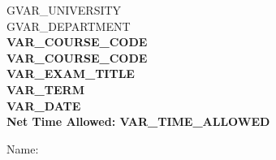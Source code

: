 \thispagestyle{empty}

\begin{center}
    \begin{large}
        GVAR_UNIVERSITY\\ %
        GVAR_DEPARTMENT\\ %
        \vspace*{0.5cm}
        {\bf {}} \hfill {\bf VAR_COURSE_CODE} \hfill {\bf {}} \\
        {\bf VAR_COURSE_CODE}  \\
        {\bf VAR_EXAM_TITLE}  \\
        {\bf VAR_TERM}  \\
        {\bf VAR_DATE }  \\ %
        {\bf Net Time Allowed: VAR_TIME_ALLOWED}  \\
        \vspace*{0.2cm}

    \end{large}
\end{center}

\large{Name:  }\hrulefill

\vspace{3mm}

